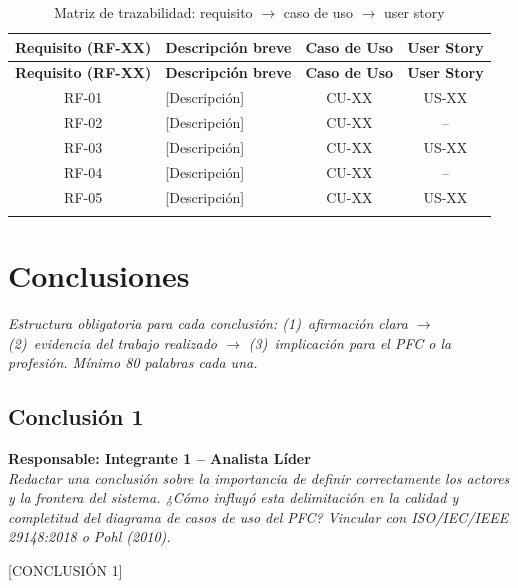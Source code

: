 \documentclass[journal,onecolumn]{IEEEtran}
\newcommand{\guia}[2]{%
  \begin{mdframed}[style=guia]
    \noindent\textbf{Responsable: #1}\\[2pt]
    \textit{#2}
  \end{mdframed}
}
\begin{document}
\begin{longtable}{|c|l|c|c|}
\caption{Matriz de trazabilidad: requisito $\rightarrow$ caso de uso $\rightarrow$ user story}
\label{tab:trazabilidad}\\
\hline
\textbf{Requisito (RF-XX)} & \textbf{Descripción breve} & \textbf{Caso de Uso} & \textbf{User Story} \\
\hline
\endfirsthead
\hline
\textbf{Requisito (RF-XX)} & \textbf{Descripción breve} & \textbf{Caso de Uso} & \textbf{User Story} \\
\hline
\endhead
RF-01 & [Descripción] & CU-XX & US-XX \\
\hline
RF-02 & [Descripción] & CU-XX & -- \\
\hline
RF-03 & [Descripción] & CU-XX & US-XX \\
\hline
RF-04 & [Descripción] & CU-XX & -- \\
\hline
RF-05 & [Descripción] & CU-XX & US-XX \\
\hline
[Agregar filas según los requisitos del PFC] & & & \\
\hline
\end{longtable}

\newpage

\section{Conclusiones}

\noindent\textit{Estructura obligatoria para cada conclusión:
(1)~afirmación clara $\rightarrow$ (2)~evidencia del trabajo realizado
$\rightarrow$ (3)~implicación para el PFC o la profesión. Mínimo 80 palabras cada una.}

\subsection*{Conclusión 1}

\guia{Integrante 1 -- Analista Líder}{%
Redactar una conclusión sobre la importancia de definir correctamente los
actores y la frontera del sistema. ¿Cómo influyó esta delimitación en la
calidad y completitud del diagrama de casos de uso del PFC?
Vincular con ISO/IEC/IEEE 29148:2018 o Pohl (2010).}

[CONCLUSIÓN 1]
\end{document}
